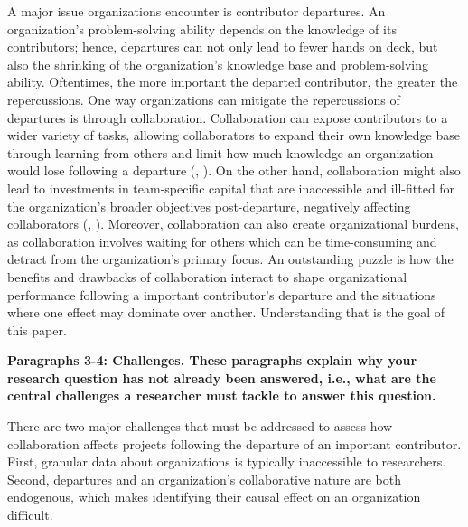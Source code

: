 \documentclass[12pt,notitlepage]{article}
\begin{document}
A major issue organizations encounter is contributor departures. An organization's problem-solving ability depends on the knowledge of its contributors; hence, departures can not only lead to fewer hands on deck, but also the shrinking of the organization's knowledge base and problem-solving ability. Oftentimes, the more important the departed contributor, the greater the repercussions. One way organizations can mitigate the repercussions of departures is through collaboration. Collaboration can expose contributors to a wider variety of tasks, allowing collaborators to expand their own knowledge base through learning from others and limit how much knowledge an organization would lose following a departure (\cite{hamilton_team_2003}, \cite{rashid_systematic_2019}). On the other hand, collaboration might also lead to investments in team-specific capital that are inaccessible and ill-fitted for the organization's broader objectives post-departure, negatively affecting collaborators (\cite{jaravel_team-specific_2018}, \cite{azoulay_does_2019}).  Moreover, collaboration can also create organizational burdens, as collaboration involves waiting for others which can be time-consuming and detract from the organization's primary focus. An outstanding puzzle is how the benefits and drawbacks of collaboration interact to shape organizational performance following a important contributor’s departure and the situations where one effect may dominate over another. Understanding that is the goal of this paper.


\textbf{Paragraphs 3-4: Challenges. These paragraphs explain why your research question has not already been answered, i.e., what are the central challenges a researcher must tackle to answer this question.}

There are two major challenges that must be addressed to assess how collaboration affects projects following the departure of an important contributor. First, granular data about organizations is typically inaccessible to researchers. Second, departures and an organization's collaborative nature are both endogenous, which makes identifying their causal effect on an organization difficult. 
\end{document}
